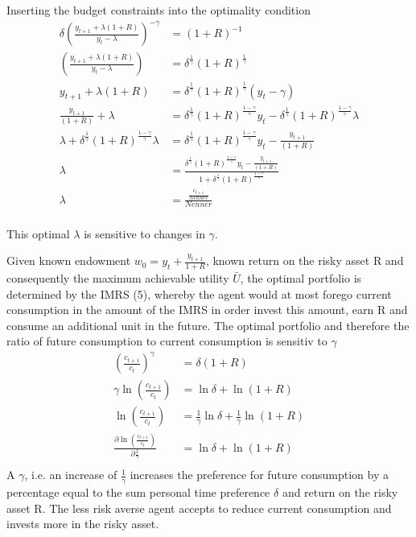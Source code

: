 \documentclass[12pt]{article}
\begin{document}
	Inserting the budget constraints into the optimality condition
	\begin{align*}
		\delta \left(\frac{y_{t+1} + \lambda(1+R)}{y_t - \lambda}\right)^{-\gamma} &= (1+R)^{-1}\\
		\left(\frac{y_{t+1} + \lambda(1+R)}{y_t - \lambda}\right) &= \delta^{\frac{1}{\gamma}}(1+R)^{\frac{1}{\gamma}}\\
		y_{t+1} + \lambda(1+R) &= \delta^{\frac{1}{\gamma}}(1+R)^{\frac{1}{\gamma}} (y_t - \gamma)\\
		\frac{y_{t+1}}{(1+R)} + \lambda &= \delta^{\frac{1}{\gamma}}(1+R)^{\frac{1-\gamma}{\gamma}} y_t - \delta^{\frac{1}{\gamma}}(1+R)^{\frac{1-\gamma}{\gamma}} \lambda\\
		\lambda  + \delta^{\frac{1}{\gamma}}(1+R)^{\frac{1-\gamma}{\gamma}} \lambda&= \delta^{\frac{1}{\gamma}}(1+R)^{\frac{1-\gamma}{\gamma}} y_t - \frac{y_{t+1}}{(1+R)}\\
		\lambda  &= \frac{\delta^{\frac{1}{\gamma}}(1+R)^{\frac{1-\gamma}{\gamma}} y_t - \frac{y_{t+1}}{(1+R)}}{1 + \delta^{\frac{1}{\gamma}}(1+R)^{\frac{1-\gamma}{\gamma}}}\\
		\lambda  &= \frac{\frac{c_{t+1}}{Nenner}}{Nenner}\\		
	\end{align*}

	This optimal $\lambda$ is sensitive to changes in $\gamma$. 

	Given known endowment $w_0 = y_t + \frac{y_{t+1}}{1+R}$, known return on the risky asset R and consequently the maximum achievable utility $\bar{U}$, the optimal portfolio is determined by the IMRS (5), whereby the agent would at most forego current consumption in the amount of the IMRS in order invest this amount, earn R and consume an additional unit in the future.  The optimal portfolio and therefore the ratio of future consumption to current consumption is sensitiv to $\gamma$
	\begin{align*}
		\left(\frac{c_{t+1}}{c_t}\right)^\gamma &= \delta (1+R)\\
		\gamma \ln \left(\frac{c_{t+1}}{c_t}\right) &= \ln \delta + \ln (1+R)\\
		\ln \left(\frac{c_{t+1}}{c_t}\right) &= \frac{1}{\gamma} \ln \delta + \frac{1}{\gamma} \ln (1+R)\\
		\frac{\partial \ln \left(\frac{c_{t+1}}{c_t}\right)}{\partial \frac{1}{\gamma}} &= \ln \delta + \ln (1+R)\\
	\end{align*}
	A  $\gamma$, i.e. an increase of $\frac{1}{\gamma}$ increases the preference for future consumption by a percentage equal to the sum personal time preference $\delta$ and return on the risky asset R. The less risk averse agent accepts to reduce current consumption and invests more in the risky asset. 
	
\end{document}
